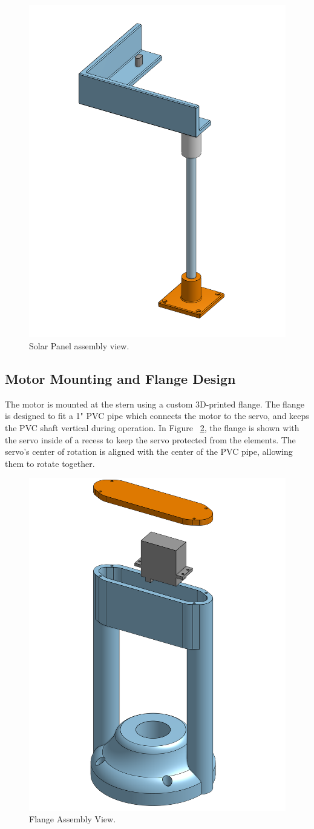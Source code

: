 \begin{figure}[htbp]        %
    \centering
    \includegraphics[width=0.4\linewidth]{"Solar_Panel_Assembly.png"}
    \caption{Solar Panel assembly view.}
    \label{fig:solar-panel}
\end{figure}

\subsection{Motor Mounting and Flange Design}
The motor is mounted at the stern using a custom 3D-printed flange. The flange is designed to fit a 1" PVC pipe which connects the motor to the servo, and keeps the PVC shaft vertical during operation. In Figure ~\ref{fig:flange}, the flange is shown with the servo inside of a recess to keep the servo protected from the elements. The servo's center of rotation is aligned with the center of the PVC pipe, allowing them to rotate together. 

\begin{figure}[htbp]        %
    \centering
    \includegraphics[width=0.4\linewidth]{"Flange_Assembly.png"}
    \caption{Flange Assembly View.}
    \label{fig:flange}
\end{figure}

